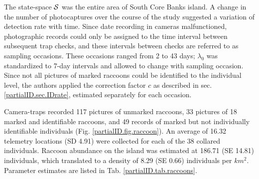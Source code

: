 The state-space ${\cal S}$ was the entire area of South Core Banks island. A change in the number of photocaptures over the course of the study suggested a variation of detection rate with time. Since date recording in cameras malfunctioned, photographic records could only be assigned to the time interval between subsequent trap checks, and these intervals between checks are referred to as sampling occasions. These occasions ranged from 2 to 43 days; $\lambda_0$ was standardized to 7-day intervals and allowed to change with sampling occasion. Since not all pictures of marked raccoons could be identified to the individual level, the authors applied the correction factor $c$ as described in sec. \ref{partialID.sec.IDrate}, estimated separately for each occasion.

Camera-traps recorded 117 pictures of unmarked raccoons, 33 pictures of 18 marked and identifiable raccoons, and 49 records of marked but not individually identifiable individuals (Fig. \ref{partialID.fig.raccoon}). An average of 16.32 telemetry locations (SD 4.91) were collected for each of the 38 collared individuals. Raccoon abundance on the island was estimated at 186.71 (SE 14.81) individuals, which translated to a density of 8.29 (SE 0.66) individuals per $km^2$. Parameter estimates are listed in Tab. \ref{partialID.tab.raccoons}.

